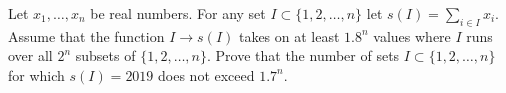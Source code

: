 Let \(x_1,\ldots,x_n\) be real numbers. For any set \(I\subset\{1,2,\ldots,n\}\) let \(s(I)=\sum_{i\in I}x_i\). Assume that the function \(I\to s(I)\) takes on at least \(1.8^n\) values where \(I\) runs over all \(2^n\) subsets of \(\{1,2,\ldots,n\}\). Prove that the number of sets \(I\subset \{1,2,\ldots,n\}\) for which \(s(I)=2019\) does not exceed \(1.7^n\).

